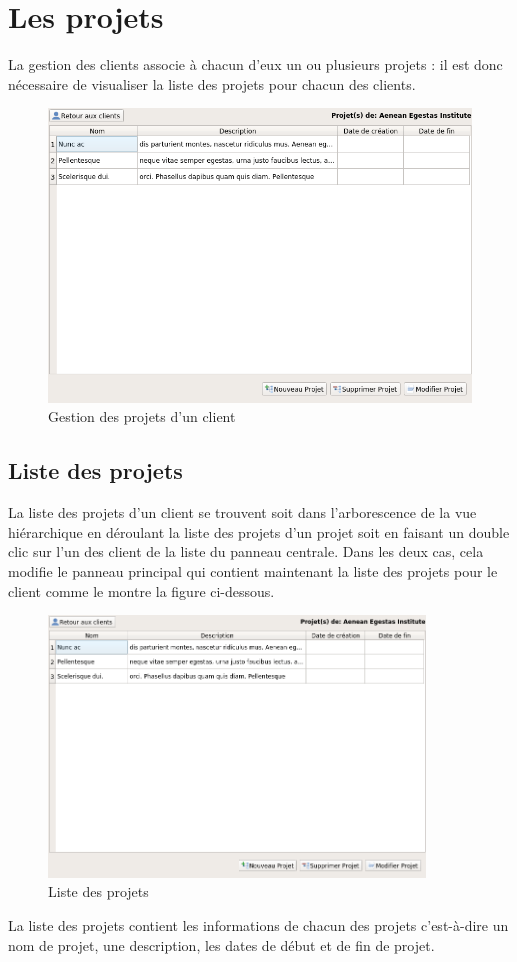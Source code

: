 \chapter{Les projets}
La gestion des clients associe à chacun d'eux un ou plusieurs projets : il est donc nécessaire de visualiser la liste des projets pour chacun des clients. 
\begin{figure}[H]
	\centering
	\includegraphics[width=12cm]{screens/projets.png}
	\caption{Gestion des projets d'un client}
\end{figure}

\section{Liste des projets}
La liste des projets d'un client se trouvent soit dans l'arborescence de la vue hiérarchique en déroulant la liste des projets d'un projet soit en faisant un double clic sur l'un des client de la liste du panneau centrale. Dans les deux cas, cela modifie le panneau principal qui contient maintenant la liste des projets pour le client comme le montre la figure ci-dessous.
\begin{figure}[H]
	\centering
	\includegraphics[width=10cm]{screens/projets.png}
	\caption{Liste des projets}
\end{figure}
La liste des projets contient les informations de chacun des projets c'est-à-dire un nom de projet, une description, les dates de début et de fin de projet. 

